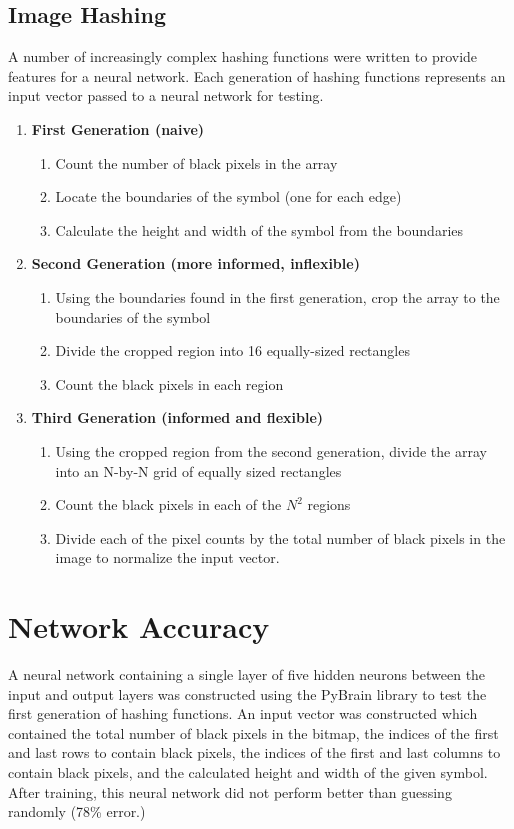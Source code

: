 \documentclass[10pt,a4paper,titlepage]{article}
\begin{document}
\subsection{Image Hashing}
	A number of increasingly complex hashing functions were written to provide features for a neural network.  Each generation of hashing functions represents an input vector passed to a neural network for testing.
	\begin{enumerate}
	\item \textbf{First Generation (naive)}
	\begin{enumerate}
	\item Count the number of black pixels in the array
	\item Locate the boundaries of the symbol (one for each edge)
	\item Calculate the height and width of the symbol from the boundaries
	\end{enumerate}
	\item \textbf{Second Generation (more informed, inflexible)}
	\begin{enumerate}
	\item Using the boundaries found in the first generation, crop the array to the boundaries of the symbol
	\item Divide the cropped region into 16 equally-sized rectangles
	\item Count the black pixels in each region
	\end{enumerate}
	\item \textbf{Third Generation (informed and flexible)}
	\begin{enumerate}
	\item Using the cropped region from the second generation, divide the array into an N-by-N grid of equally sized rectangles
	\item Count the black pixels in each of the $N^2$ regions
	\item Divide each of the pixel counts by the total number of black pixels in the image to normalize the input vector.
	\end{enumerate}
	\end{enumerate}
		

\section{Network Accuracy}
	A neural network containing a single layer of five hidden neurons between the input and output layers was constructed using the PyBrain library to test the first generation of hashing functions.  An input vector was constructed which contained the total number of black pixels in the bitmap, the indices of the first and last rows to contain black pixels, the indices of the first and last columns to contain black pixels, and the calculated height and width of the given symbol.  After training, this neural network did not perform better than guessing randomly (78\% error.)
	
\end{document}
